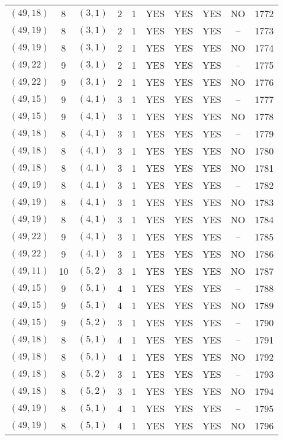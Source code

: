 \begin{longtable}{|c|c|c|c|c|c|c|c|c|c|}
$(49, 18)$ & 8 & $(3, 1)$ & 2 & 1 & YES & YES & YES & NO & 1772\\
$(49, 19)$ & 8 & $(3, 1)$ & 2 & 1 & YES & YES & YES & -- & 1773\\
$(49, 19)$ & 8 & $(3, 1)$ & 2 & 1 & YES & YES & YES & NO & 1774\\
$(49, 22)$ & 9 & $(3, 1)$ & 2 & 1 & YES & YES & YES & -- & 1775\\
$(49, 22)$ & 9 & $(3, 1)$ & 2 & 1 & YES & YES & YES & NO & 1776\\
$(49, 15)$ & 9 & $(4, 1)$ & 3 & 1 & YES & YES & YES & -- & 1777\\
$(49, 15)$ & 9 & $(4, 1)$ & 3 & 1 & YES & YES & YES & NO & 1778\\
$(49, 18)$ & 8 & $(4, 1)$ & 3 & 1 & YES & YES & YES & -- & 1779\\
$(49, 18)$ & 8 & $(4, 1)$ & 3 & 1 & YES & YES & YES & NO & 1780\\
$(49, 18)$ & 8 & $(4, 1)$ & 3 & 1 & YES & YES & YES & NO & 1781\\
$(49, 19)$ & 8 & $(4, 1)$ & 3 & 1 & YES & YES & YES & -- & 1782\\
$(49, 19)$ & 8 & $(4, 1)$ & 3 & 1 & YES & YES & YES & NO & 1783\\
$(49, 19)$ & 8 & $(4, 1)$ & 3 & 1 & YES & YES & YES & NO & 1784\\
$(49, 22)$ & 9 & $(4, 1)$ & 3 & 1 & YES & YES & YES & -- & 1785\\
$(49, 22)$ & 9 & $(4, 1)$ & 3 & 1 & YES & YES & YES & NO & 1786\\
$(49, 11)$ & 10 & $(5, 2)$ & 3 & 1 & YES & YES & YES & NO & 1787\\
$(49, 15)$ & 9 & $(5, 1)$ & 4 & 1 & YES & YES & YES & -- & 1788\\
$(49, 15)$ & 9 & $(5, 1)$ & 4 & 1 & YES & YES & YES & NO & 1789\\
$(49, 15)$ & 9 & $(5, 2)$ & 3 & 1 & YES & YES & YES & -- & 1790\\
$(49, 18)$ & 8 & $(5, 1)$ & 4 & 1 & YES & YES & YES & -- & 1791\\
$(49, 18)$ & 8 & $(5, 1)$ & 4 & 1 & YES & YES & YES & NO & 1792\\
$(49, 18)$ & 8 & $(5, 2)$ & 3 & 1 & YES & YES & YES & -- & 1793\\
$(49, 18)$ & 8 & $(5, 2)$ & 3 & 1 & YES & YES & YES & NO & 1794\\
$(49, 19)$ & 8 & $(5, 1)$ & 4 & 1 & YES & YES & YES & -- & 1795\\
$(49, 19)$ & 8 & $(5, 1)$ & 4 & 1 & YES & YES & YES & NO & 1796\\

\end{longtable}
